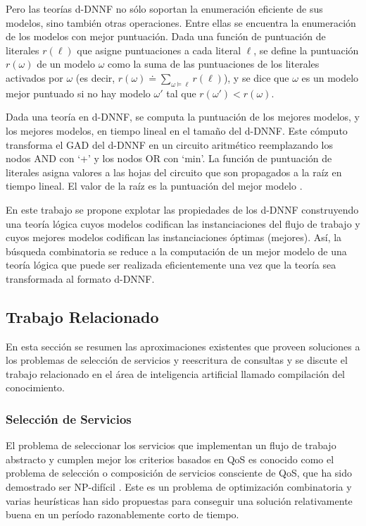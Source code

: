 Pero las teorías d-DNNF no sólo soportan la enumeración eficiente de sus
modelos, sino también otras operaciones. Entre ellas se encuentra la enumeración
de los modelos con mejor puntuación. Dada una función de puntuación de literales
$r(\ell)$ que asigne puntuaciones a cada literal $\ell$, se define la puntuación
$r(\omega)$ de un modelo $\omega$ como la suma de las puntuaciones de los literales
activados por $\omega$ (es decir,
$r(\omega)\doteq\sum_{\omega\vDash\ell}r(\ell)$), y se dice que $\omega$ es un modelo
mejor puntuado si no hay modelo $\omega'$ tal que $r(\omega')<r(\omega)$.

Dada una teoría en d-DNNF, se computa la puntuación de los mejores modelos, y
los mejores modelos, en tiempo lineal en el tamaño del d-DNNF. Este cómputo
transforma el GAD del d-DNNF en un circuito aritmético reemplazando los nodos
AND con `+' y los nodos OR con `min'. La función de puntuación de literales
asigna valores a las hojas del circuito que son propagados a la raíz en tiempo
lineal. El valor de la raíz es la puntuación del mejor modelo \cite{darwiche:weighted}.

En este trabajo se propone explotar las propiedades de los d-DNNF construyendo una
teoría lógica cuyos modelos codifican las instanciaciones del flujo de trabajo
y cuyos mejores modelos codifican las instanciaciones óptimas (mejores). Así, la
búsqueda combinatoria se reduce a la computación de un mejor modelo de una
teoría lógica que puede ser realizada eficientemente una vez que la teoría sea
transformada al formato d-DNNF.

\subsection{Trabajo Relacionado}

En esta sección se resumen las aproximaciones existentes que proveen soluciones
a los problemas de selección de servicios y reescritura de consultas y se
discute el trabajo relacionado en el área de inteligencia artificial llamado
compilación del conocimiento.

\subsubsection{Selección de Servicios}

El problema de seleccionar los servicios que implementan un flujo de trabajo
abstracto y cumplen mejor los criterios basados en QoS es conocido como el
problema de selección o composición de servicios consciente de QoS, que ha sido
demostrado ser NP-difícil \cite{Hiroshi2008}. Este es un problema de optimización
combinatoria y varias heurísticas han sido propuestas para conseguir una
solución relativamente buena en un período razonablemente corto de tiempo.

